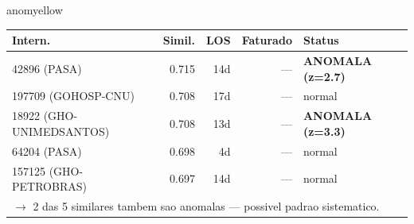 \documentclass[a4paper,10pt]{article}
\begin{document}
\begin{anomalycard}[Internacao 713 | GHO-COPEL | MODERADO (z=2.05)]{anomyellow}
\begin{tabular}{l r r r l}\toprule\textbf{Intern.} & \textbf{Simil.} & \textbf{LOS} & \textbf{Faturado} & \textbf{Status} \\\midrule
42896 (PASA) & 0.715 & 14d & --- & \textcolor{anomred}{\textbf{ANOMALA (z=2.7)}} \\
197709 (GOHOSP-CNU) & 0.708 & 17d & --- & \textcolor{jcubeblue}{normal} \\
18922 (GHO-UNIMEDSANTOS) & 0.708 & 13d & --- & \textcolor{anomred}{\textbf{ANOMALA (z=3.3)}} \\
64204 (PASA) & 0.698 & 4d & --- & \textcolor{jcubeblue}{normal} \\
157125 (GHO-PETROBRAS) & 0.697 & 14d & --- & \textcolor{jcubeblue}{normal} \\
\multicolumn{5}{l}{\textcolor{anomred}{\small $\rightarrow$ 2 das 5 similares tambem sao anomalas --- possivel padrao sistematico.}} \\
\bottomrule\end{tabular}


\end{anomalycard}

\newpage
\end{document}
